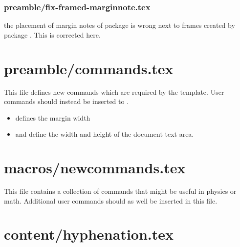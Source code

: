 
\subsubsection{preamble/fix-framed-marginnote.tex}

the placement of margin notes of package  is wrong next to frames created by package . This is corrected here.



\section{preamble/commands.tex}

This file defines new commands which are required by the template. User commands should instead be inserted to .

\begin{itemize}
\item {} defines the margin width
\item {} and  define the width and height of the document text area.
\end{itemize}


\section{macros/newcommands.tex}

This file contains a collection of commands that might be useful in physics or math. Additional user commands should as well be inserted in this file.


\section{content/hyphenation.tex}

